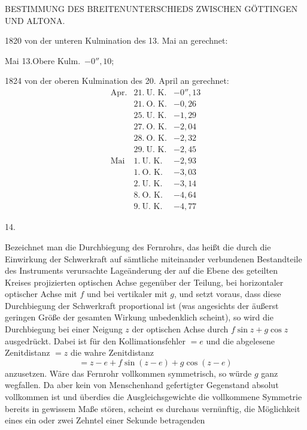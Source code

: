 \clearpage
\noindent{}\parbox[t]{\dimexpr\textwidth-10mm\relax}{\centering\scriptsize BESTIMMUNG DES BREITENUNTERSCHIEDS ZWISCHEN GÖTTINGEN UND ALTONA.}\par
1820 von der unteren Kulmination des 13. Mai an gerechnet:
\begin{center}Mai 13.\quad Obere Kulm.\ $-0''{,}10$;\end{center}
1824 von der oberen Kulmination des 20. April an gerechnet:
\[
\begin{array}{rl|r}
\text{Apr.}&21.\ \text{U. K.}&-0''{,}13\\
&21.\ \text{O. K.}&-0{,}26\\
&25.\ \text{U. K.}&-1{,}29\\
&27.\ \text{O. K.}&-2{,}04\\
&28.\ \text{O. K.}&-2{,}32\\
&29.\ \text{U. K.}&-2{,}45\\
\text{Mai}&1.\ \text{U. K.}&-2{,}93\\
&1.\ \text{O. K.}&-3{,}03\\
&2.\ \text{U. K.}&-3{,}14\\
&8.\ \text{O. K.}&-4{,}64\\
&9.\ \text{U. K.}&-4{,}77
\end{array}
\]
\begin{center}14.\end{center}
Bezeichnet man die Durchbiegung des Fernrohrs, das heißt die durch die Einwirkung der Schwerkraft auf sämtliche miteinander verbundenen Bestandteile des Instruments verursachte Lageänderung der auf die Ebene des geteilten Kreises projizierten optischen Achse gegenüber der Teilung, bei horizontaler optischer Achse mit $f$ und bei vertikaler mit $g$, und setzt voraus, dass diese Durchbiegung der Schwerkraft proportional ist (was angesichts der äußerst geringen Größe der gesamten Wirkung unbedenklich scheint), so wird die Durchbiegung bei einer Neigung $z$ der optischen Achse durch $f\sin z+g\cos z$ ausgedrückt. Dabei ist für den Kollimationsfehler $=e$ und die abgelesene Zenitdistanz $=z$ die wahre Zenitdistanz
\[
=z-e+f\sin(z-e)+g\cos(z-e)
\]
anzusetzen. Wäre das Fernrohr vollkommen symmetrisch, so würde $g$ ganz wegfallen. Da aber kein von Menschenhand gefertigter Gegenstand absolut vollkommen ist und überdies die Ausgleichsgewichte die vollkommene Symmetrie bereits in gewissem Maße stören, scheint es durchaus vernünftig, die Möglichkeit eines ein oder zwei Zehntel einer Sekunde betragenden

